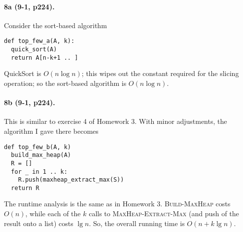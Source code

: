 \documentclass[
]{article}
\begin{document}




 \paragraph{8a (9-1, p224).} 
Consider the sort-based algorithm
\begin{verbatim}
def top_few_a(A, k):
  quick_sort(A)
  return A[n-k+1 .. ]
\end{verbatim}
QuickSort is $O(n\log n)$; this wipes out the constant required for the slicing operation; so the sort-based algorithm is $O(n\log n)$.

 \paragraph{8b (9-1, p224).} 
 This is similar to exercise 4 of Homework 3. With minor adjustments, the algorithm I gave there becomes
\begin{verbatim}
def top_few_b(A, k)
  build_max_heap(A)
  R = []
  for _ in 1 .. k:
    R.push(maxheap_extract_max(S))
  return R
\end{verbatim}
The runtime analysis is the same as in Homework 3. \textsc{Build-MaxHeap} costs $O(n)$, while each of the $k$ calls to \textsc{MaxHeap-Extract-Max} (and push of the result onto a list) costs $\lg n$.  So, the overall running time is $O(n + k\lg n)$.
\end{document}
